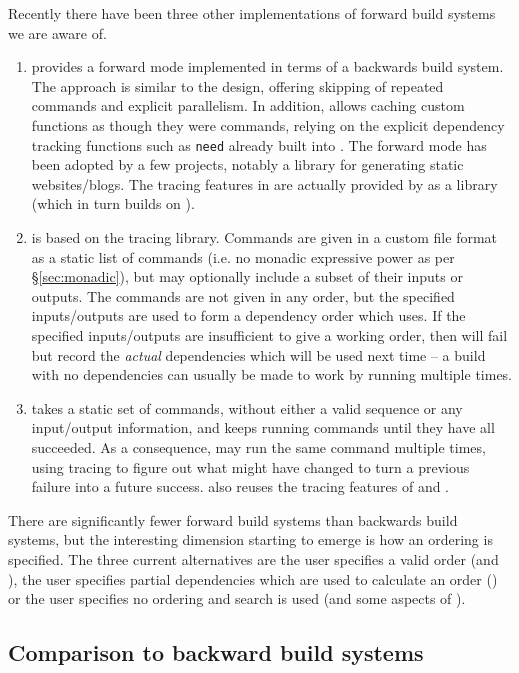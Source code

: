 Recently there have been three other implementations of forward build systems we are aware of.

\begin{enumerate}
\item \Shake \cite{shake} provides a forward mode implemented in terms of a backwards build system. The approach is similar to the \Fabricate design, offering skipping of repeated commands and explicit parallelism. In addition, \Shake allows caching custom functions as though they were commands, relying on the explicit dependency tracking functions such as \texttt{need} already built into \Shake. The forward mode has been adopted by a few projects, notably a library for generating static websites/blogs. The tracing features in \Rattle are actually provided by \Shake as a library (which in turn builds on \Fsatrace).
\item \Fac \cite{fac} is based on the \Bigbro tracing library. Commands are given in a custom file format as a static list of commands (i.e. no monadic expressive power as per \S\ref{sec:monadic}), but may optionally include a subset of their inputs or outputs. The commands are not given in any order, but the specified inputs/outputs are used to form a dependency order which \Fac uses. If the specified inputs/outputs are insufficient to give a working order, then \Fac will fail but record the \emph{actual} dependencies which will be used next time -- a build with no dependencies can usually be made to work by running \Fac multiple times.
\item \Stroll \cite{stroll} takes a static set of commands, without either a valid sequence or any input/output information, and keeps running commands until they have all succeeded. As a consequence, \Stroll may run the same command multiple times, using tracing to figure out what might have changed to turn a previous failure into a future success. \Stroll also reuses the tracing features of \Shake and \Fsatrace.
\end{enumerate}

There are significantly fewer forward build systems than backwards build systems, but the interesting dimension starting to emerge is how an ordering is specified. The three current alternatives are the user specifies a valid order (\Fabricate and \Rattle), the user specifies partial dependencies which are used to calculate an order (\Fac) or the user specifies no ordering and search is used (\Stroll and some aspects of \Fac).

\subsection{Comparison to backward build systems}

